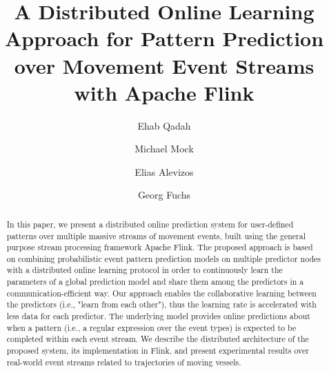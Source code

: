 \documentclass[sigconf,edbt]{acmart-edbt2018}
\begin{document}
\title{A Distributed Online Learning Approach for Pattern Prediction over Movement Event Streams with Apache Flink}

%
  
\author{Ehab Qadah}

\author{Michael Mock}


\author{Elias Alevizos}

\author{Georg Fuchs}

\renewcommand{\shortauthors}{}


\begin{abstract}
In this paper, we present a distributed online prediction system for user-defined patterns over multiple massive streams of movement events, built using the general purpose stream processing framework Apache Flink. The proposed approach is based on combining probabilistic event pattern prediction models on multiple predictor nodes with a distributed online learning protocol in order to continuously learn the parameters of a global prediction model and share them among the predictors in a communication-efficient way. Our approach enables the  collaborative learning between the predictors (i.e., "learn from each other"), thus the learning rate is accelerated with less data for each predictor. The underlying model provides online predictions about when a pattern (i.e., a regular expression over the event types) is expected to be completed within each event stream. We describe the distributed architecture of the proposed system, its implementation in Flink, and present experimental results over real-world event streams related to trajectories of moving vessels.

\end{abstract}
\end{document}
